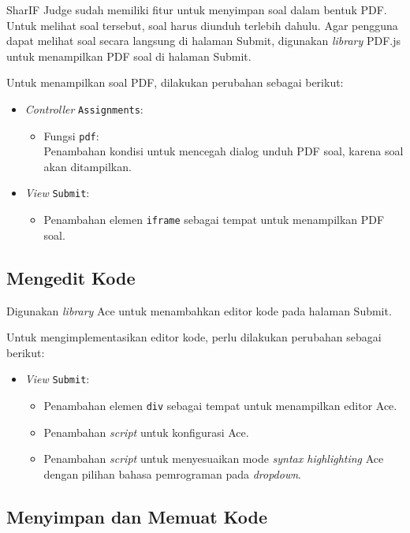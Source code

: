 SharIF Judge sudah memiliki fitur untuk menyimpan soal dalam bentuk PDF. Untuk melihat soal tersebut, soal harus diunduh terlebih dahulu. Agar pengguna dapat melihat soal secara langsung di halaman Submit, digunakan \textit{library} PDF.js untuk menampilkan PDF soal di halaman Submit.

Untuk menampilkan soal PDF, dilakukan perubahan sebagai berikut:
\begin{itemize}
	\item \textit{Controller} \verb|Assignments|:
    \begin{itemize}
		\item Fungsi \verb|pdf|: \\ Penambahan kondisi untuk mencegah dialog unduh PDF soal, karena soal akan ditampilkan.
    \end{itemize}
    \item \textit{View} \verb|Submit|:
    \begin{itemize}
        \item Penambahan elemen \verb|iframe| sebagai tempat untuk menampilkan PDF soal.
    \end{itemize}
\end{itemize}

\subsection{Mengedit Kode}
\label{subsec:4:editor}

Digunakan \textit{library} Ace untuk menambahkan editor kode pada halaman Submit.

Untuk mengimplementasikan editor kode, perlu dilakukan perubahan sebagai berikut:
\begin{itemize}
    \item \textit{View} \verb|Submit|:
    \begin{itemize}
        \item Penambahan elemen \verb|div| sebagai tempat untuk menampilkan editor Ace.
        \item Penambahan \textit{script} untuk konfigurasi Ace.
        \item Penambahan \textit{script} untuk menyesuaikan mode \textit{syntax highlighting} Ace dengan pilihan bahasa pemrograman pada \textit{dropdown}.
    \end{itemize}
\end{itemize}

\subsection{Menyimpan dan Memuat Kode}
\label{subsec:4:simpan}

